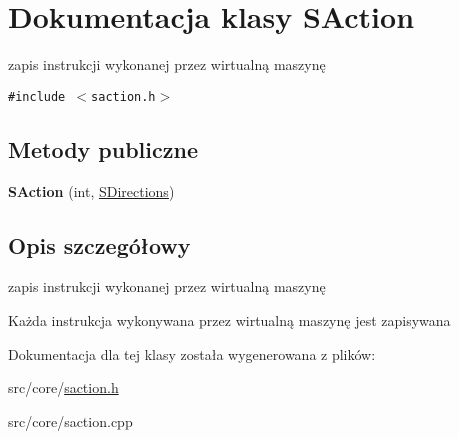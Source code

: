 \hypertarget{classSAction}{
\section{Dokumentacja klasy SAction}
\label{classSAction}
}
zapis instrukcji wykonanej przez wirtualną maszynę  


{\tt \#include $<$saction.h$>$}

\subsection*{Metody publiczne}
\begin{CompactItemize}
\item 
\hypertarget{classSAction_e6b8bce1c13c9c643ab520ebc022d9c0}{
\textbf{SAction} (int, \hyperlink{senums_8h_039d4115103dc22e0555ecc968fecbf0}{SDirections})}
\label{classSAction_e6b8bce1c13c9c643ab520ebc022d9c0}

\end{CompactItemize}


\subsection{Opis szczegółowy}
zapis instrukcji wykonanej przez wirtualną maszynę 

Każda instrukcja wykonywana przez wirtualną maszynę jest zapisywana 

Dokumentacja dla tej klasy została wygenerowana z plików:\begin{CompactItemize}
\item 
src/core/\hyperlink{saction_8h}{saction.h}\item 
src/core/saction.cpp\end{CompactItemize}
